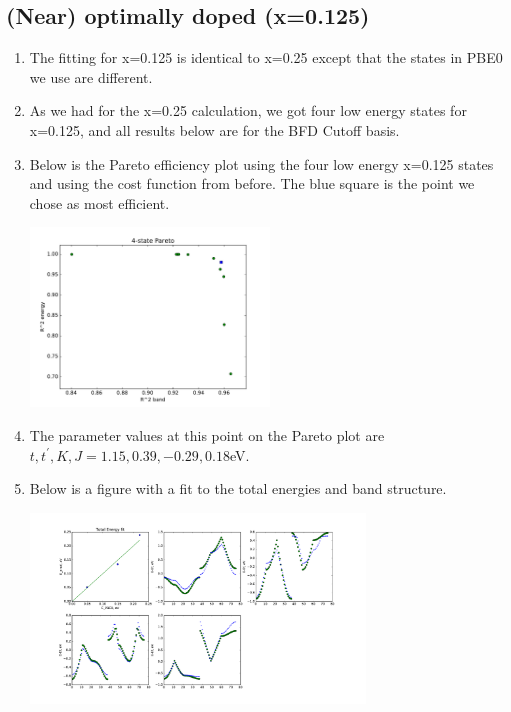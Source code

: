 \documentclass{article}
\begin{document}
\subsection{(Near) optimally doped (x=0.125)}
\begin{enumerate}
\item The fitting for x=0.125 is identical to x=0.25 except that the states in PBE0 we use are different.

\item As we had for the x=0.25 calculation, we got four low energy states for x=0.125, and all results below are for the BFD Cutoff basis.

\item Below is the Pareto efficiency plot using the four low energy x=0.125 states and using the cost function from before. The blue square is the point we chose as most efficient.

\includegraphics[width=0.5\textwidth]{../doped_fv/PBE0_8/tb_fit_0p125/pareto4.pdf}
\linebreak

\item The parameter values at this point on the Pareto plot are $t,t^\prime,K,J=  1.15,  0.39, -0.29, 0.18 $eV.

\item Below is a figure with a fit to the total energies and band structure.

\includegraphics[width=0.7\textwidth]{../doped_fv/PBE0_8/tb_fit_0p125/pareto4_sel.pdf}
\end{enumerate}
\end{document}
